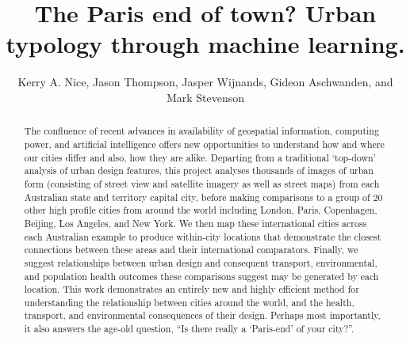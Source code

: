 \documentclass[sageh,times]{sagej}
\begin{document}
%
%


\title{The Paris end of town? Urban typology through machine learning.}

\author{Kerry A. Nice, Jason Thompson, Jasper Wijnands, Gideon Aschwanden, and Mark Stevenson}






\begin{abstract}

The confluence of recent advances in availability of geospatial information, computing power, and artificial intelligence offers new opportunities to understand how and where our cities differ and also, how they are alike. Departing from a traditional `top-down' analysis of urban design features, this project analyses thousands of images of urban form (consisting of street view and satellite imagery as well as street maps) from each Australian state and territory capital city, before making comparisons to a group of 20 other high profile cities from around the world including London, Paris, Copenhagen, Beijing, Los Angeles, and New York. We then map these international cities across each Australian example to produce within-city locations that demonstrate the closest connections between these areas and their international comparators. Finally, we suggest relationships between urban design and consequent transport, environmental, and population health outcomes these comparisons suggest may be generated by each location. This work demonstrates an entirely new and highly efficient method for understanding the relationship between cities around the world, and the health, transport, and environmental consequences of their design. Perhaps most importantly, it also answers the age-old question, ``Is there really a `Paris-end' of your city?''.
\end{abstract}
\end{document}
